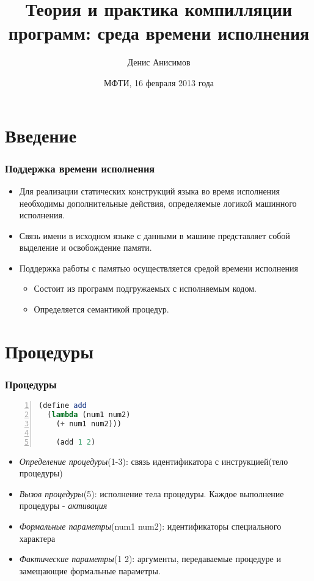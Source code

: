 \documentclass[16pt,pdf,unicode]{beamer}
\title[Организация памяти]{Теория и практика компилляции программ: среда времени исполнения}
\author[Д. Анисимов]{Денис Анисимов}
\institute[МФТИ]{Московский физико-технический университет\\
	{\tiny государственный университет}\\}
\date[16.02.2013]{МФТИ, 16 февраля 2013 года}
\begin{document}
\begin{frame}[plain]
\setcounter{framenumber}{0}
\titlepage
\end{frame}

\section{Введение}
\begin{frame}
\frametitle{Поддержка времени исполнения}
\begin{itemize}
  \item Для реализации статических конструкций языка во время исполнения необходимы дополнительные действия, определяемые логикой машинного исполнения.
  \item Связь имени в исходном языке с данными в машине представляет собой выделение и освобождение памяти.
  \item Поддержка работы с памятью осуществляется средой времени исполнения
  \begin{itemize}
    \item Состоит из программ подгружаемых с исполняемым кодом.
    \item Определяется семантикой процедур.  
  \end{itemize}
\end{itemize}
\end{frame}

\section{Процедуры}
\begin{frame}[fragile]
\frametitle{Процедуры}
\begin{lstlisting}[language=Scheme,numbers=left, stepnumber=1, numbersep=1pt]
(define add
  (lambda (num1 num2)
    (+ num1 num2)))

	(add 1 2)
\end{lstlisting}
\begin{itemize}
  \item \textit{Определение процедуры}(1-3): связь идентификатора с инструкцией(тело процедуры)
  \item \textit{Вызов процедуры}(5): исполнение тела процедуры. Каждое выполнение процедуры - \textit{активация}
  \item \textit{Формальные параметры}(num1 num2): идентификаторы специального характера
  \item \textit{Фактические параметры}(1 2): аргументы, передаваемые процедуре и замещающие формальные параметры.
\end{itemize}
\end{frame}
\end{document}
